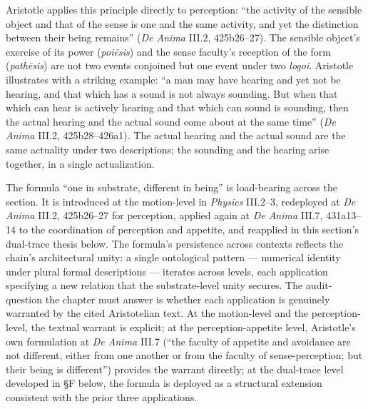 \documentclass{article}
\begin{document}
Aristotle applies this principle directly to perception: ``the activity of the sensible object and that of the sense is one and the same activity, and yet the distinction between their being remains'' (\textit{De Anima} III.2, 425b26--27). The sensible object's exercise of its power (\textit{poiēsis}) and the sense faculty's reception of the form (\textit{pathēsis}) are not two events conjoined but one event under two \textit{logoi}. Aristotle illustrates with a striking example: ``a man may have hearing and yet not be hearing, and that which has a sound is not always sounding. But when that which can hear is actively hearing and that which can sound is sounding, then the actual hearing and the actual sound come about at the same time'' (\textit{De Anima} III.2, 425b28--426a1). The actual hearing and the actual sound are the same actuality under two descriptions; the sounding and the hearing arise together, in a single actualization.

The formula ``one in substrate, different in being'' is load-bearing across the section. It is introduced at the motion-level in \textit{Physics} III.2--3, redeployed at \textit{De Anima} III.2, 425b26--27 for perception, applied again at \textit{De Anima} III.7, 431a13--14 to the coordination of perception and appetite, and reapplied in this section's dual-trace thesis below. The formula's persistence across contexts reflects the chain's architectural unity: a single ontological pattern --- numerical identity under plural formal descriptions --- iterates across levels, each application specifying a new relation that the substrate-level unity secures. The audit-question the chapter must answer is whether each application is genuinely warranted by the cited Aristotelian text. At the motion-level and the perception-level, the textual warrant is explicit; at the perception-appetite level, Aristotle's own formulation at \textit{De Anima} III.7 (``the faculty of appetite and avoidance are not different, either from one another or from the faculty of sense-perception; but their being is different'') provides the warrant directly; at the dual-trace level developed in §F below, the formula is deployed as a structural extension consistent with the prior three applications.
\end{document}
